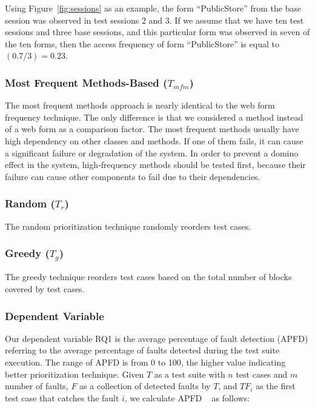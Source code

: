 Using Figure~\ref{fig:sessions} as an example, the form ``PublicStore'' 
from the base session was observed in test sessions 2 and 3. 
If we assume that we have ten test sessions and three base sessions,
and this particular form was observed in seven of the ten forms, then the
access frequency of form ``PublicStore'' is equal to $(0.7 / 3) = 0.23$.
	
\subsubsection*{Most Frequent Methods-Based ($T_{mfm}$)}
The most frequent methods approach is nearly identical to the web form frequency technique. 
The only difference is that we considered a method instead of a web form 
as a comparison factor. 
The most frequent methods usually have high dependency on other classes and methods. 
If one of them fails, it can cause a significant failure or degradation of the system. 
In order to prevent a domino effect in the system, high-frequency methods 
should be tested first, because their failure can cause 
other components to fail due to their dependencies.	 	

\subsubsection*{Random ($T_{r}$)}
The random prioritization technique randomly reorders test cases.

\subsubsection*{Greedy ($T_{g}$)}
The greedy technique reorders test cases based on the total number of 
blocks covered by test cases. 

\subsubsection{Dependent Variable} 

Our dependent variable RQ1 is the average percentage of fault detection (APFD)
referring to the average percentage of faults detected during the test suite execution. 
The range of APFD is from 0 to 100, the higher value indicating better prioritization technique. 
Given $T$ as a test suite with $n$ test cases and $m$ number of faults, 
$F$ as a collection of detected faults by $T$, and
$TF_{i}$ as the first test case that catches the fault $i$, 
we calculate APFD ~\cite{apfd} as follows:

